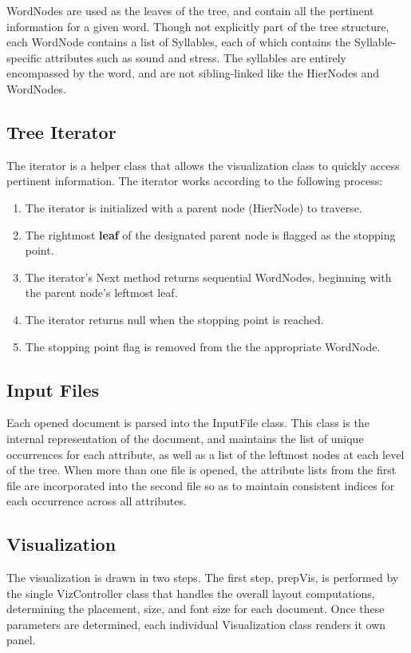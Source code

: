 \documentclass[fleqn]{article}
\begin{document}
WordNodes are used as the leaves of the tree, and contain all the pertinent information for a given word.  Though not explicitly part of the tree structure, each WordNode contains a list of Syllables, each of which contains the Syllable-specific attributes such as sound and stress.  The syllables are entirely encompassed by the word, and are not sibling-linked like the HierNodes and WordNodes.  

\subsection{Tree Iterator}
The iterator is a helper class that allows the visualization class to quickly access pertinent information.  The iterator works according to the following process:

\begin{enumerate}
\item The iterator is initialized with a parent node (HierNode) to traverse.
\item The rightmost {\bf leaf} of the designated parent node is flagged as the stopping point.
\item The iterator's Next method returns sequential WordNodes, beginning with the parent node's leftmost leaf.
\item The iterator returns null when the stopping point is reached.
\item The stopping point flag is removed from the the appropriate WordNode.
\end{enumerate}

\subsection{Input Files}
Each opened document is parsed into the InputFile class.  This class is the internal representation of the document, and maintains the list of unique occurrences for each attribute, as well as a list of the leftmost nodes at each level of the tree.  When more than one file is opened, the attribute lists from the first file are incorporated into the second file so as to maintain consistent indices for each occurrence across all attributes.  

\subsection{Visualization}
The visualization is drawn in two steps.  The first step, prepVis, is performed by the single VizController class that handles the overall layout computations, determining the placement, size, and font size for each document.  Once these parameters are determined, each individual Visualization class renders it own panel.
\end{document}
